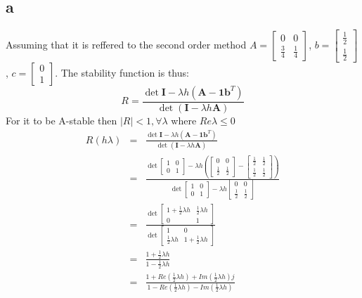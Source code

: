 \documentclass[11pt]{article}
\newcommand{\abs}[1]{|#1|}
\begin{document}
\subsection*{a}
Assuming that it is reffered to the second order method $A = \begin{bmatrix}
0 & 0 \\
\frac{3}{4} & \frac{1}{4} 
\end{bmatrix}
$, $b=\begin{bmatrix} \frac{1}{2} \\ \frac{1}{2}
\end{bmatrix}
$, $c= \begin{bmatrix} 0 \\ 1 
\end{bmatrix}
$. The stability function is thus:
\[R = \frac{\det{\mathbf{I} - \lambda h (\mathbf{A} - \mathbf{1} \mathbf{b}^T)}}{\det{(\mathbf{I} - \lambda h \mathbf{A})}} \]
For it to be A-stable then $\abs{R} < 1, \forall \lambda$ where $Re{\lambda} \leq 0$
\begin{eqnarray*}
R(h\lambda) &=& \frac{\det{\mathbf{I} - \lambda h (\mathbf{A} - \mathbf{1} \mathbf{b}^T)}}{\det{(\mathbf{I} - \lambda h \mathbf{A})}} \\
&=& \frac{\det{
\begin{bmatrix}
1 & 0 \\
0 & 1
\end{bmatrix}
- \lambda h (
\begin{bmatrix}
0 & 0 \\
\frac{1}{2} & \frac{1}{2}
\end{bmatrix}
-
\begin{bmatrix}
\frac{1}{2} & \frac{1}{2} \\
\frac{1}{2} & \frac{1}{2}
\end{bmatrix}
) } }{ \det{
\begin{bmatrix}
1 & 0 \\
0 & 1
\end{bmatrix}
- \lambda h
\begin{bmatrix}
0 & 0 \\
\frac{1}{2} & \frac{1}{2}
\end{bmatrix}
}} \\
&=& \frac{ \det{
\begin{bmatrix}
1 + \frac{1}{2}\lambda h &  \frac{1}{2} \lambda h \\
0 & 1
\end{bmatrix}
}}{\det{
\begin{bmatrix}
1 & 0 \\
\frac{1}{2} \lambda h & 1 + \frac{1}{2}\lambda h
\end{bmatrix}
}} \\
&=& \frac{1 + \frac{1}{2} \lambda h}{1 - \frac{1}{2} \lambda h} \\
&=& \frac{1 + Re(\frac{1}{2} \lambda h) + Im(\frac{1}{2} \lambda h)j}{1 - Re(\frac{1}{2} \lambda h) - Im(\frac{1}{2} \lambda h)}    
\end{eqnarray*}
\end{document}
